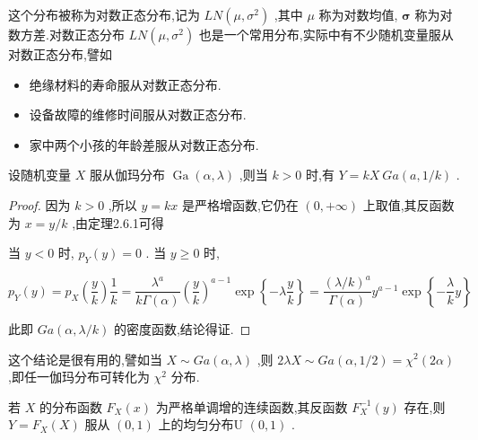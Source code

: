 这个分布被称为对数正态分布,记为 $ L N\left(\mu, \sigma^{2}\right) $ ,其中 $ \mu $ 称为对数均值, $ \mathbf{\sigma} $ 称为对数方差.对数正态分布 $ L N\left(\mu, \sigma^{2}\right) $ 也是一个常用分布,实际中有不少随机变量服从对数正态分布,譬如

\begin{itemize}
	\item 绝缘材料的寿命服从对数正态分布.
	\item 设备故障的维修时间服从对数正态分布.
	\item 家中两个小孩的年龄差服从对数正态分布.
\end{itemize}

\begin{theorem}{}{}
	设随机变量 $ X $ 服从伽玛分布 $ \operatorname{Ga}(\alpha, \lambda) $ ,则当 $ k>0 $ 时,有 $ Y=kX~Ga(a,1/k) $ .
\end{theorem}

\begin{proof}
	因为 $ k>0 $ ,所以 $ y=kx $ 是严格增函数,它仍在 $ (0,+\infty) $ 上取值,其反函数为 $ x=y/k $ ,由定理2.6.1可得
	
	当 $ y<0 $ 时, $ p_{Y}(y)=0 $ .
	当 $ y \geqslant 0 $ 时,
	
	\[
	p_{Y}(y)=p_{X}\left(\frac{y}{k}\right) \frac{1}{k}=\frac{\lambda^{a}}{k \Gamma(\alpha)}\left(\frac{y}{k}\right)^{a-1} \exp \left\{-\lambda \frac{y}{k}\right\}=\frac{(\lambda / k)^{a}}{\Gamma(\alpha)} y^{a-1} \exp \left\{-\frac{\lambda}{k} y\right\}
	\]
	
	此即 $ G a(\alpha, \lambda / k) $ 的密度函数,结论得证.
\end{proof}

这个结论是很有用的,譬如当 $ X \sim G a(\alpha, \lambda) $ ,则 $ 2 \lambda X \sim G a(\alpha, 1 / 2)= \chi^{2}(2 \alpha) $ ,即任一伽玛分布可转化为 $ \chi^{2} $ 分布.

\begin{theorem}{}{}
	若 $ X $ 的分布函数 $ F_{X}(x) $ 为严格单调增的连续函数,其反函数 $ F_{X}^{-1}(y) $ 存在,则 $ Y=F_{X}(X) $ 服从 $ (0,1) $ 上的均匀分布U $ (0,1) $ .
\end{theorem}

